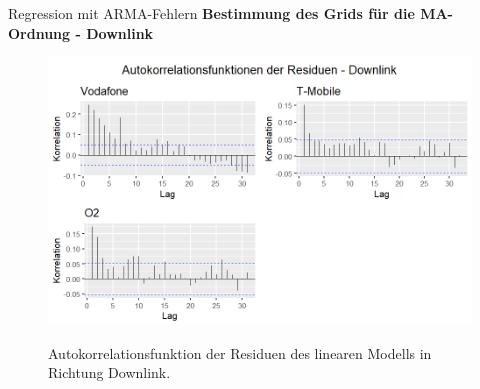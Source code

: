 \begin{frame}{Regression mit ARMA-Fehlern}
	\textbf{Bestimmung des Grids für die MA-Ordnung - Downlink}
	\begin{figure}
		\includegraphics[scale=0.38]{plots/arima/downlink/res_acf}\\
		\caption{Autokorrelationsfunktion der Residuen des linearen Modells in Richtung Downlink.}
		\label{res_acf_dl}
	\end{figure}	
\end{frame}